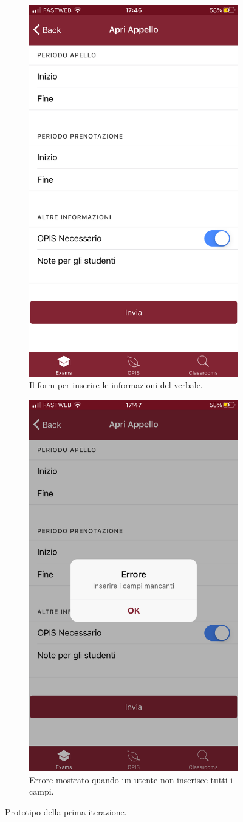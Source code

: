 \documentclass[Lau, oneside, noexaminfo]{sapthesis}%
\begin{document}
\begin{figure}[H]
\begin{subfigure}{0.6\textwidth}
		\label{fig:sub-third}
	  \end{subfigure}
	  \begin{subfigure}{0.6\textwidth}
		\centering
		\includegraphics[width=0.5\linewidth]{ui-iterations/i/form}  
		\caption{Il form per inserire le informazioni del verbale.}
		\label{fig:sub-fourth}
	  \end{subfigure}
	  \begin{subfigure}{0.6\textwidth}
		\centering
		\includegraphics[width=0.5\linewidth]{ui-iterations/i/error-form}  
		\caption{Errore mostrato quando un utente non inserisce tutti i campi.}
		\label{fig:sub-fifth}
	  \end{subfigure}
	  
	\caption{Prototipo della prima iterazione.}
	\label{fig:it-1}
\end{figure}	
\end{document}
